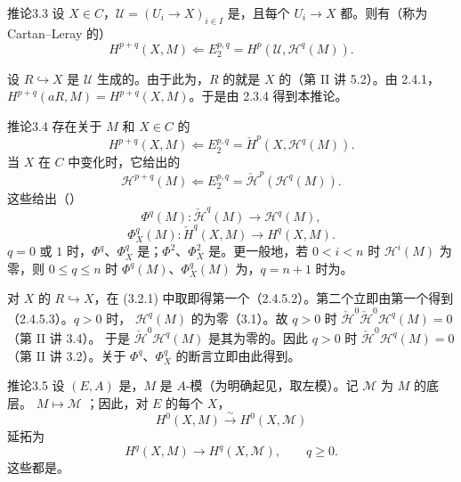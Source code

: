 \begin{SGAresult}{推论}{3.3}
设 $X\in C$，$\mathcal U=(U_i\to X)_{i\in I}$ 是，且每个 $U_i\to X$ 都。则有（称为 Cartan--Leray 的）
\[
 H^{p+q}(X,M)\Longleftarrow E_2^{p,q}=H^p(\mathcal U,\mathscr H^q(M)).\tag{3.3.1}
\]
\end{SGAresult}
设 $R\hookrightarrow X$ 是 $\mathcal U$ 生成的。由于此为，$R$ 的就是 $X$ 的（第 II 讲 5.2）。由 2.4.1，$H^{p+q}(aR,M)=H^{p+q}(X,M)$。于是由 2.3.4 得到本推论。
\begin{SGAresult}{推论}{3.4}
存在关于 $M$ 和 $X\in C$ 的
\[
 H^{p+q}(X,M)\Longleftarrow E_2^{p,q}=\check H^p(X,\mathscr H^q(M)).\tag{3.4.1}
\]
当 $X$ 在 $C$ 中变化时，它给出的
\[
 \mathscr H^{p+q}(M)\Longleftarrow E_2^{p,q}=\check{\mathscr H}^p(\mathscr H^q(M)).\tag{3.4.2}
\]
这些给出（）
\[
 \Phi^q(M):\check{\mathscr H}^q(M)\longrightarrow\mathscr H^q(M),\tag{3.4.3}
\]
\[
 \Phi_X^q(M):\check H^q(X,M)\longrightarrow H^q(X,M).\tag{3.4.4}
\]
$q=0$ 或 $1$ 时，$\Phi^q$、$\Phi_X^q$ 是；$\Phi^2$、$\Phi_X^2$ 是。更一般地，若 $0<i<n$ 时 $\mathscr H^i(M)$ 为零，则 $0\leq q\leq n$ 时 $\Phi^q(M)$、$\Phi_X^q(M)$ 为，$q=n+1$ 时为。
\end{SGAresult}
对 $X$ 的 $R\hookrightarrow X$，在 (3.2.1) 中取即得第一个（2.4.5.2）。第二个立即由第一个得到（2.4.5.3）。$q>0$ 时， $\mathscr H^q(M)$ 的为零（3.1）。故 $q>0$ 时
$\check{\mathscr H}^0\check{\mathscr H}^0\mathscr H^q(M)=0$（第 II 讲 3.4）。
于是 $\check{\mathscr H}^0\mathscr H^q(M)$ 是其为零的。因此 $q>0$ 时 $\check{\mathscr H}^0\mathscr H^q(M)=0$（第 II 讲 3.2）。关于 $\Phi^q$、$\Phi_X^q$ 的断言立即由此得到。
\begin{SGAresult}{推论}{3.5}
设 $(E,A)$ 是，$M$ 是 $A$-模（为明确起见，取左模）。记 $\mathcal M$ 为 $M$ 的底层。 $M\mapsto\mathcal M$ ；因此，对 $E$ 的每个 $X$，
\[
 H^0(X,M)\xrightarrow{\sim}H^0(X,\mathcal M)
\]
延拓为
\[
 H^q(X,M)\longrightarrow H^q(X,\mathcal M),\qquad q\geq0.
\]
这些都是。
\end{SGAresult}
